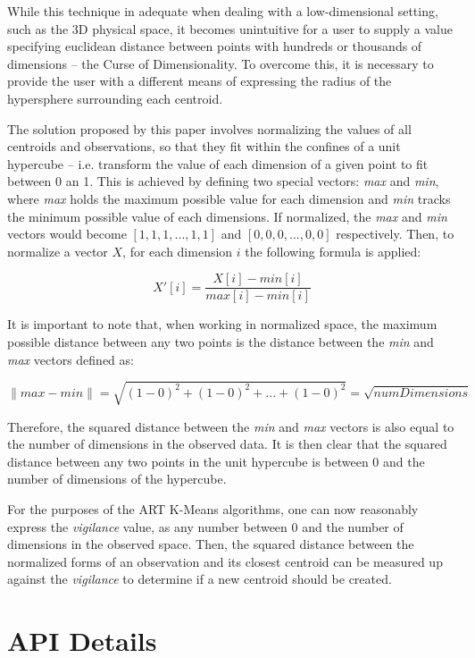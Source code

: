 \documentclass{l4proj}
\begin{document}
While this technique in adequate when dealing with a low-dimensional setting, such as the 3D physical space, it becomes unintuitive for a user to supply a value specifying euclidean distance between points with hundreds or thousands of dimensions -- the Curse of Dimensionality\cite{CurseOfDimensionality}. To overcome this, it is necessary to provide the user with a different means of expressing the radius of the hypersphere surrounding each centroid.

The solution proposed by this paper involves normalizing the values of all centroids and observations, so that they fit within the confines of a unit hypercube -- i.e. transform the value of each dimension of a given point to fit between 0 an 1. This is achieved by defining two special vectors: \textit{max} and \textit{min}, where \textit{max} holds the maximum possible value for each dimension and \textit{min} tracks the minimum possible value of each dimensions. If normalized, the \textit{max} and \textit{min} vectors would become $[1, 1, 1, ..., 1, 1]$ and $[0, 0, 0, ..., 0, 0]$ respectively. Then, to normalize a vector $X$, for each dimension $i$ the following formula is applied:

$$X'[i] = \frac{X[i] - min[i]}{max[i] - min[i]}$$

It is important to note that, when working in normalized space, the maximum possible distance between any two points is the distance between the \textit{min} and \textit{max} vectors defined as:

$$\|max - min\| = \sqrt{(1-0)^2 + (1-0)^2 + ... + (1-0)^2} = \sqrt{numDimensions}$$

\noindent Therefore, the squared distance between the \textit{min} and \textit{max} vectors is also equal to the number of dimensions in the observed data. It is then clear that the squared distance between any two points in the unit hypercube is between 0 and the number of dimensions of the hypercube. 

For the purposes of the ART K-Means algorithms, one can now reasonably express the \textit{vigilance} value, as any number between 0 and the number of dimensions in the observed space. Then, the squared distance between the normalized forms of an observation and its closest centroid can be measured up against the \textit{vigilance} to determine if a new centroid should be created.

\section{API Details}
\end{document}
